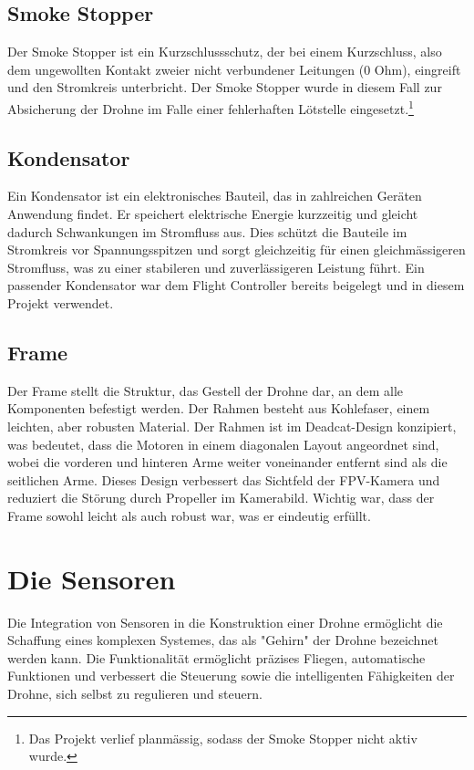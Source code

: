 \subsection{Smoke Stopper} \label{sec:Smoke Stopper}
Der Smoke Stopper\cite{SmokeStopper} ist ein Kurzschlussschutz, der bei einem Kurzschluss, also dem ungewollten Kontakt zweier nicht verbundener Leitungen (0 Ohm), eingreift und den Stromkreis unterbricht. Der Smoke Stopper wurde in diesem Fall zur Absicherung der Drohne im Falle einer fehlerhaften Lötstelle eingesetzt.\footnote{Das Projekt verlief planmässig, sodass der Smoke Stopper nicht aktiv wurde.}

\subsection{Kondensator} \label{sec:Kondensator}
Ein Kondensator ist ein elektronisches Bauteil, das in zahlreichen Geräten Anwendung findet. Er speichert elektrische Energie kurzzeitig und gleicht dadurch Schwankungen im Stromfluss aus. Dies schützt die Bauteile im Stromkreis vor Spannungsspitzen und sorgt gleichzeitig für einen gleichmässigeren Stromfluss, was zu einer stabileren und zuverlässigeren Leistung führt. Ein passender Kondensator war dem Flight Controller bereits beigelegt und in diesem Projekt verwendet. 

\subsection{Frame}   \label{sec:Frame}
Der Frame \cite{Frame} stellt die Struktur, das Gestell der Drohne dar, an dem alle Komponenten befestigt werden. Der Rahmen besteht aus Kohlefaser, einem leichten, aber robusten Material. Der Rahmen ist im Deadcat-Design\cite{fpv24deadcatframes} konzipiert, was bedeutet, dass die Motoren in einem diagonalen Layout angeordnet sind, wobei die vorderen und hinteren Arme weiter voneinander entfernt sind als die seitlichen Arme. Dieses Design verbessert das Sichtfeld der FPV-Kamera und reduziert die Störung durch Propeller im Kamerabild. Wichtig war, dass der Frame sowohl leicht als auch robust war, was er eindeutig erfüllt.

\section{Die Sensoren}\label{sec:Sensoren}

Die Integration von Sensoren in die Konstruktion einer Drohne ermöglicht die Schaffung eines komplexen Systemes, das als "Gehirn" der Drohne bezeichnet werden kann. 
Die Funktionalität ermöglicht präzises Fliegen, automatische Funktionen und verbessert die Steuerung sowie die intelligenten Fähigkeiten der Drohne, sich selbst zu regulieren und steuern. 

